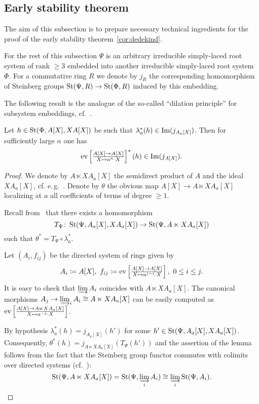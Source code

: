 \subsection{Early stability theorem}
The aim of this subsection is to prepare necessary technical ingredients for the proof of the early stability theorem~\cref{cor:dedekind}.

For the rest of this subsection $\Psi$ is an arbitrary irreducible simply-laced root system of rank $\geq 3$ embedded into another irreducible simply-laced root system $\Phi$.
For a commutative ring $R$ we denote by $j_R$ the corresponding homomorphism of Steinberg groups $\operatorname{St}(\Psi, R) \to \operatorname{St}(\Phi, R)$ induced by this embedding.

The following result is the analogue of the so-called ``dilation principle'' for subsystem embeddings, cf.~\cite[Corollary~2.4]{Tu83}.
\begin{lemma}\label{lem:dp-2}
Let $h\in\operatorname{St}(\Phi, A[X], X A[X])$ be such that $\lambda_a^*(h) \in \operatorname{Im}(j_{A_a[X]})$.
Then for sufficiently large $n$ one has
\[\mathrm{ev} \textstyle \left[\frac{A[X] \rightarrow A[X]}{X \mapsto a^n\cdot X}\right]^*(h) \in \mathrm{Im}(j_{A[X]}).\]
\end{lemma}
\begin{proof}
 We denote by $A\ltimes XA_a[X]$ the semidirect product of $A$ and the ideal $XA_a[X]$, cf. e.\,g.~\cite[Definition~3.2]{S15}.
 Denote by $\theta$ the obvious map $A[X]\rightarrow A\ltimes XA_a[X]$ localizing at $a$ all coefficients of terms of degree $\geq 1$.

 Recall from~\cite[\S~2]{LS17} that there exists a homomorphism
 \[T_\Psi \colon \operatorname{St}(\Psi, A_a[X], XA_a[X]) \to \operatorname{St}(\Psi, A \ltimes XA_a[X])\]
 such that $\theta^* = T_\Psi \circ \lambda_a^*$.

 Let $(A_i, f_{ij})$ be the directed system of rings given by
 \[A_i\coloneqq A[X],\ f_{ij} \coloneqq \mathrm{ev} \textstyle \left[\frac{A[X] \rightarrow A[X]}{X \mapsto a^{j-i} \cdot X}\right],\ 0 \leq i\leq j.\]
 It is easy to check that $\varinjlim A_i$ coincides with $A \ltimes XA_a[X]$.
 The canonical morphisms $A_j\rightarrow \varinjlim_i A_i \cong A \ltimes XA_a[X]$ can be easily computed as $\mathrm{ev} \textstyle \left[\frac{A[X] \rightarrow A\ltimes XA_a[X]}{X \mapsto a^{-j} \cdot X}\right]$.

 By hypothesis $\lambda_a^*(h) = j_{A_a[X]}(h')$ for some $h' \in \operatorname{St}(\Psi, A_a[X], XA_a[X])$.
 Consequently, $\theta^*(h) = j_{A \ltimes XA_a[X]}(T_\Psi(h'))$
 and the assertion of the lemma follows from the fact that the Steinberg group functor commutes with
  colimits over directed systems (cf.~\cite[Lemma~2.2]{Tu83}):
 \[\operatorname{St}(\Psi, A\ltimes XA_a[X]) = \operatorname{St}(\Psi, \varinjlim_i A_i) \cong \varinjlim_i \operatorname{St}(\Psi,A_i). \qedhere\]
\end{proof}

